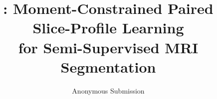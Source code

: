 \documentclass[10pt,twocolumn,letterpaper]{article}
\title{\method: Moment-Constrained Paired Slice-Profile Learning\\
for Semi-Supervised MRI Segmentation}
\author{Anonymous \confName{} Submission}
\begin{document}
\maketitle








{
    \small
    
    
}

% 
\end{document}
